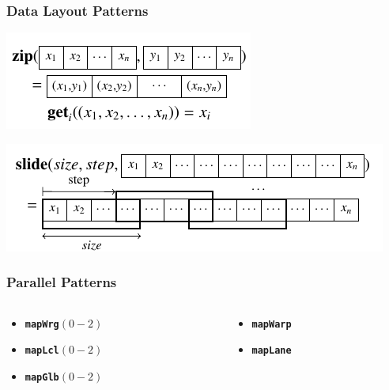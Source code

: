 \documentclass[10pt,usetotalslideindicator]{beamer}
\newcommand{\code}[1]{\textbf{\texttt{#1}}}
\begin{document}
\begin{frame}
\frametitle{Data Layout Patterns}
    \begin{block}{}
        \begin{center}
            \includegraphics[width=.55\textwidth]{../images/data_layout_patterns3.pdf}
        \end{center}
        \begin{center}
            \includegraphics[width=.85\textwidth]{../images/data_layout_patterns4.pdf}
        \end{center}
    \end{block}
\end{frame}

\begin{frame}
\frametitle{Parallel Patterns}
\begin{columns}[onlytextwidth]
\begin{column}{0.45\textwidth}
\begin{itemize}
	\item \code{mapWrg$(0-2)$}
	\item \code{mapLcl$(0-2)$}
	\item \code{mapGlb$(0-2)$}
\end{itemize}
\end{column}
\begin{column}{0.45\textwidth}
\begin{itemize}	
	\item \code{mapWarp}
	\item \code{mapLane}
\end{itemize}
\end{column}
\end{columns}
\end{frame}
\end{document}
